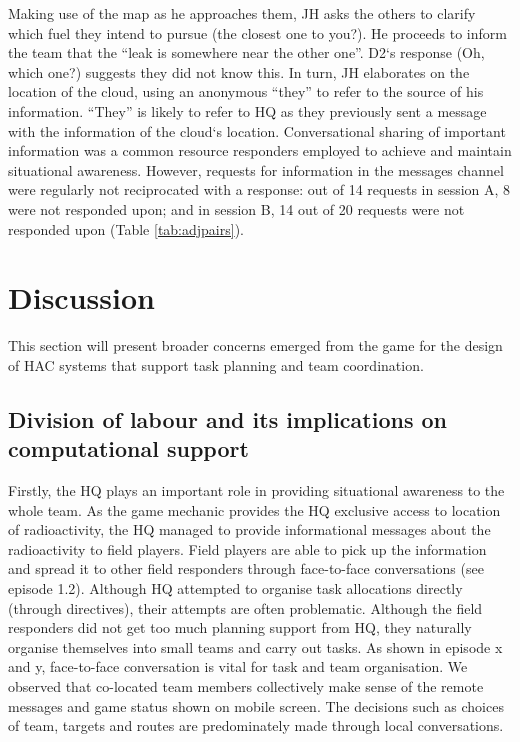 Making use of the map as he approaches them, JH asks the others to clarify which fuel they intend to pursue (the closest one to you?). He proceeds to inform the team that the ``leak is somewhere near the other one''. D2`s response (Oh, which one?) suggests they did not know this. In turn, JH elaborates on the location of the cloud, using an anonymous ``they'' to refer to the source of his information. ``They'' is likely to refer to HQ as they previously sent a message with the information of the cloud`s location. Conversational sharing of important information was a common resource responders employed to achieve and maintain situational awareness. However, requests for information in the messages channel were regularly not reciprocated with a response: out of 14 requests in session A, 8 were not responded upon; and in session B, 14 out of 20 requests were not responded upon (Table \ref{tab:adjpairs}).\\

\section{Discussion}
This section will present broader concerns emerged from the game for the design of HAC systems that support task planning and team coordination.\\

\subsection{Division of labour and its implications on computational support}\label{sec:study1dlabour}
Firstly, the HQ plays an important role in providing situational awareness to the whole team. As the game mechanic provides the HQ exclusive access to location of radioactivity, the HQ managed to provide informational messages about the radioactivity to field players. Field players are able to pick up the information and spread it to other field responders through face-to-face conversations (see episode 1.2). Although HQ attempted to organise task allocations directly (through directives), their attempts are often problematic.  Although the field responders did not get too much planning support from HQ, they naturally organise themselves into small teams and carry out tasks. As shown in episode x and y,  face-to-face conversation is vital for task and team organisation. We observed that co-located team members collectively make sense of the remote messages and game status shown on mobile screen. The decisions such as choices of team, targets and routes are  predominately made through local conversations.\\

